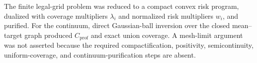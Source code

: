 The finite legal-grid problem was reduced to a compact convex risk program, dualized with coverage multipliers \(\lambda_i\) and normalized risk multipliers \(w_i\), and purified.  For the continuum, direct Gaussian-ball inversion over the closed mean--target graph produced \(C_{\mathrm{prof}}\) and exact union coverage.  A mesh-limit argument was not asserted because the required compactification, positivity, semicontinuity, uniform-coverage, and continuum-purification steps are absent.